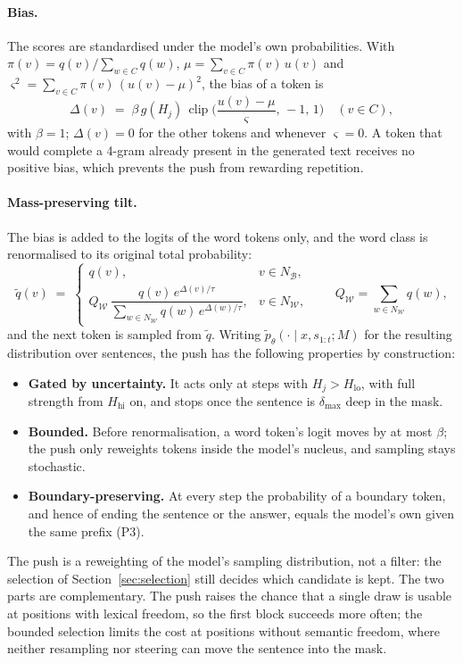 \paragraph{Bias.} The scores are standardised under the model's own probabilities. With
$\pi(v) = q(v) / \sum_{w \in C} q(w)$, $\mu = \sum_{v \in C} \pi(v)\, u(v)$ and
$\varsigma^2 = \sum_{v \in C} \pi(v)\, (u(v) - \mu)^2$, the bias of a token is
\begin{equation}
  \Delta(v) \;=\; \beta \, g(H_j) \, \operatorname{clip}\!\Big( \frac{u(v) - \mu}{\varsigma}, \, -1, \, 1 \Big)
  \quad (v \in C),
  \label{eq:bias}
\end{equation}
with $\beta = 1$; $\Delta(v) = 0$ for the other tokens and whenever $\varsigma = 0$. A token that would complete a 4-gram
already present in the generated text receives no positive bias, which prevents the push from rewarding repetition.

\paragraph{Mass-preserving tilt.} The bias is added to the logits of the word tokens only, and the word class is
renormalised to its original total probability:
\begin{equation}
  \tilde q(v) \;=\;
  \begin{cases}
    q(v), & v \in N_{\mathcal{B}}, \\[3pt]
    Q_{\mathcal{W}} \, \dfrac{q(v)\, e^{\Delta(v)/\tau}}{\sum_{w \in N_{\mathcal{W}}} q(w)\, e^{\Delta(w)/\tau}}, & v \in N_{\mathcal{W}},
  \end{cases}
  \qquad Q_{\mathcal{W}} = \sum_{w \in N_{\mathcal{W}}} q(w) ,
  \label{eq:tilt}
\end{equation}
and the next token is sampled from $\tilde q$. Writing $\tilde p_\theta(\cdot \mid x, s_{1:t}; M)$ for the resulting
distribution over sentences, the push has the following properties by construction:
\begin{itemize}
  \item \textbf{Gated by uncertainty.} It acts only at steps with $H_j > H_{\text{lo}}$, with full strength from
  $H_{\text{hi}}$ on, and stops once the sentence is $\delta_{\max}$ deep in the mask.
  \item \textbf{Bounded.} Before renormalisation, a word token's logit moves by at most $\beta$; the push only reweights
  tokens inside the model's nucleus, and sampling stays stochastic.
  \item \textbf{Boundary-preserving.} At every step the probability of a boundary token, and hence of ending the
  sentence or the answer, equals the model's own given the same prefix (P3).
\end{itemize}
The push is a reweighting of the model's sampling distribution, not a filter: the selection of
Section~\ref{sec:selection} still decides which candidate is kept. The two parts are complementary. The push raises the
chance that a single draw is usable at positions with lexical freedom, so the first block succeeds more often; the
bounded selection limits the cost at positions without semantic freedom, where neither resampling nor steering can move
the sentence into the mask.

